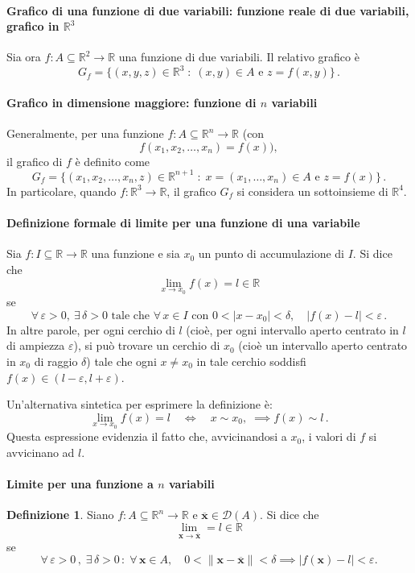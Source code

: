 \documentclass{article}
\theoremstyle{plain}
\theoremstyle{definition}
\newtheorem{defn}{Definizione}[section]
\theoremstyle{remark}
\begin{document}
\paragraph{Grafico di una funzione di due variabili: funzione reale di due variabili, grafico in $\mathbb{R}^3$}
Sia ora \(f : A \subseteq \mathbb{R}^2 \to \mathbb{R}\) una funzione di due variabili. Il relativo grafico è 
\[
G_f=\{(x,y,z)\in\mathbb{R}^3 \;:\; (x,y)\in A \text{ e } z=f(x,y)\}\,.
\]


\paragraph{Grafico in dimensione maggiore: funzione di $n$ variabili}
Generalmente, per una funzione \(f : A \subseteq \mathbb{R}^n \to \mathbb{R}\) (con
\[
f(x_1,x_2,\dots,x_n)=f(x)),
\]
il grafico di \(f\) è definito come
\[
G_f=\{(x_1,x_2,\dots,x_n,z)\in\mathbb{R}^{n+1} \;:\; x=(x_1,\dots,x_n)\in A \text{ e } z=f(x)\}\,.
\]
In particolare, quando \(f\colon \mathbb{R}^3\to\mathbb{R}\), il grafico \(G_f\) si considera un sottoinsieme di \(\mathbb{R}^4\).

\paragraph{Definizione formale di limite per una funzione di una variabile}
Sia \(f : I \subseteq \mathbb{R} \to \mathbb{R}\) una funzione e sia \(x_0\) un punto di accumulazione di \(I\). 
Si dice che 
\[
\lim_{x\to x_0}f(x)=l\in\mathbb{R}
\]
se
\[
\forall\,\varepsilon>0,\ \exists\,\delta>0 \text{ tale che } \forall\, x\in I \text{ con } 0<|x-x_0|<\delta,\quad |f(x)-l|<\varepsilon\,.
\]
In altre parole, per ogni cerchio di \(l\) (cioè, per ogni intervallo aperto centrato in \(l\) di ampiezza \(\varepsilon\)), si può trovare un cerchio di \(x_0\) (cioè un intervallo aperto centrato in \(x_0\) di raggio \(\delta\)) tale che ogni \(x\neq x_0\) in tale cerchio soddisfi \(f(x)\in (l-\varepsilon,l+\varepsilon)\).

Un'alternativa sintetica per esprimere la definizione è:
\[
\lim_{x\to x_0} f(x)=l \quad \iff \quad x\sim x_0,\;\implies f(x)\sim l\,.
\]
Questa espressione evidenzia il fatto che, avvicinandosi a \(x_0\), i valori di \(f\) si avvicinano ad \(l\).

\vspace{10pt}

\paragraph{Limite per una funzione a $n$ variabili}
\begin{bxthm}
\begin{defn}
    Siano $f:A\subseteq\mathbb{R}^n\to\mathbb{R}$ e $\overline{\mathbf{x}}\in\mathcal{D}(A)$. 
    Si dice che 
    \[\lim_{\mathbf{x}\to \overline{\mathbf{x}}}=l\in\mathbb{R}\]
    se 
    \[\forall\, \varepsilon>0\,,\; \exists\, \delta>0\,:\;\forall\, \mathbf{x}\in A,\quad 0<\| \mathbf{x}-\overline{\mathbf{x}} \|<\delta\implies | f(\mathbf{x})-l |<\varepsilon.\]
\end{defn}
\end{bxthm}
\end{document}
